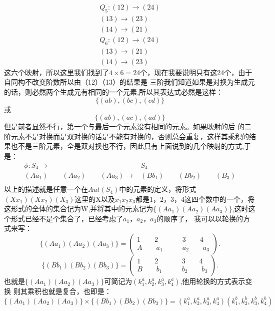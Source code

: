 \documentclass[utf8]{ctexart}
\begin{document}
\begin{align*}
	Q_{5}: (12)\rightarrow (24) \\
	(13)\rightarrow (23)\\
	(14)\rightarrow (21)
\end{align*}
\begin{align*}
	Q_{6}: (12)\rightarrow (24) \\
	(13)\rightarrow (21)\\
	(14)\rightarrow (23)
\end{align*}
这六个映射，所以这里我们找到了$4\times 6=24$个，现在我要说明只有这24个，由于自同构不改变阶数所以由（12）（13）的结果是
三阶我们知道如果是对换为生成元的话，则必然两个生成元有相同的一个元素,所以其表达式必然是这样：
$$\{(ab),(bc),(cd)\}$$或$$\{(ab),(ac),(ad)\}$$但是前者显然不行，第一个与最后一个元素没有相同的元素。如果映射的后 的二阶元素不是对换而是双对换的话是不能有对换的，否则总会重复，这样其乘积的结果也不是三阶元素，全是双对换也不行，因此只有上面说到的几个映射的方式,于是：
\begin{align*}
	\phi: S_{4}\rightarrow& S_{4} \\
	(Aa_{1})\qquad(Aa_{2})\qquad(Aa_{3})\rightarrow& (Bb_{1})\qquad(Bb_{2})\qquad(B_{3})\\
	\end{align*}
以上的描述就是任意一个在$Aut(S_{4})$中的元素的定义，将形式${(Xx_{1})(Xx_{2})(X_{3})}$这里的X以及$x_{1}$$x_{2}$$x_{3}$都是1，2，3，4这四个数中的一个，将这形式的全体的集合记为W,并将其中的元素记为$\{(Aa_{1})(Aa_{2})(Aa_{3})\}$,这时这个形式已经不是个集合了，已经考虑了$a_{1}，a_{2}，a_{3}$的顺序了，%
我可以以轮换的方式来写：
$$ \{(Aa_{1})(Aa_{2})(Aa_{3})\}=\left(
\begin{aligned}
1 \qquad 2 \qquad& 3\qquad 4\\
A \qquad a_{1} \qquad& a_{2}\qquad a_{3} 
\end{aligned}
\right).
$$
$$ \{(Bb_{1})(Bb_{2})(Bb_{3})\}=\left(
\begin{aligned}
1 \qquad 2 \qquad& 3\qquad 4\\
B \qquad b_{1} \qquad& b_{2}\qquad b_{3} 
\end{aligned}
\right).
$$也就是$\{(Aa_{1})(Aa_{2})(Aa_{3})\}$可简记为$(k^{a}_{1},k^{a}_{2},k^{a}_{3},k^{a}_{4})$,他用轮换的方式表示变换
则其乘积也就是复合，也即是：
$$\{(Aa_{1})(Aa_{2})(Aa_{3})\}\times\{(Bb_{1})(Bb_{2})(Bb_{3})\}=(k^{a}_{1},k^{a}_{2},k^{a}_{3},k^{a}_{4})(k^{b}_{1},k^{b}_{2},k^{b}_{3},k^{b}_{4})$$
\end{document}
